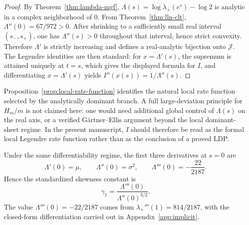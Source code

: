 \begin{proof}
By Theorem~\ref{thm:lambda-mgf}, \(\Lambda(s)=\log\lambda_+(e^s)-\log2\) is analytic in a complex neighborhood of \(0\).
From Theorem~\ref{thm:lln-clt}, \(\Lambda''(0)=67/972>0\).
After shrinking to a sufficiently small real interval \((s_-,s_+)\), one has \(\Lambda''(s)>0\) throughout that interval, hence strict convexity.
Therefore \(\Lambda'\) is strictly increasing and defines a real-analytic bijection onto \(\mathcal J\).
The Legendre identities are then standard: for \(x=\Lambda'(s)\), the supremum is attained uniquely at \(t=s\), which gives the displayed formula for \(I\), and differentiating \(x=\Lambda'(s)\) yields \(I''(x(s))=1/\Lambda''(s)\).
\end{proof}

\begin{remark}\label{thm:local-ldp}
Proposition~\ref{prop:local-rate-function} identifies the natural local rate function selected by the analytically dominant branch.
A full large-deviation principle for \(H_m/m\) is not claimed here: one would need additional global control of \(\Lambda(s)\) on the real axis, or a verified G\"artner--Ellis argument beyond the local dominant-sheet regime.
In the present manuscript, \(I\) should therefore be read as the formal local Legendre rate function rather than as the conclusion of a proved LDP.
\end{remark}

\begin{remark}
Under the same differentiability regime, the first three derivatives at \(s=0\) are
\[
\Lambda'(0)=\mu,\qquad
\Lambda''(0)=\sigma^2,\qquad
\Lambda'''(0)=-\frac{22}{2187}.
\]
Hence the standardized skewness constant is
\[
\gamma_1=\frac{\Lambda'''(0)}{\Lambda''(0)^{3/2}}.
\]
The value \(\Lambda'''(0)=-22/2187\) comes from \(\lambda_+'''(1)=814/2187\), with the closed-form differentiation carried out in Appendix~\ref{app:implicit}.
\end{remark}

